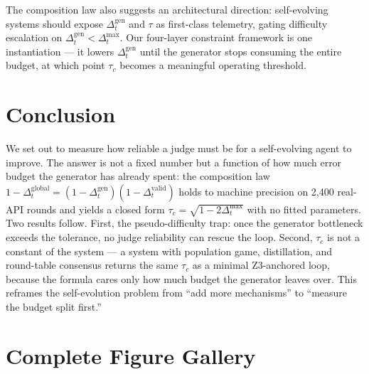 \documentclass{article}
\begin{document}
The composition law also suggests an architectural direction: self-evolving systems should expose
$\Delta_t^{\mathrm{gen}}$ and $\tau$ as first-class telemetry, gating difficulty escalation on
$\Delta_t^{\mathrm{gen}} < \Delta_t^{\max}$. Our four-layer constraint framework is one instantiation
--- it lowers $\Delta_t^{\mathrm{gen}}$ until the generator stops consuming the entire budget, at
which point $\tau_c$ becomes a meaningful operating threshold.

\section{Conclusion}

We set out to measure how reliable a judge must be for a self-evolving agent to improve. The answer is
not a fixed number but a function of how much error budget the generator has already spent: the
composition law
$1 - \Delta_t^{\mathrm{global}} = (1 - \Delta_t^{\mathrm{gen}})(1 - \Delta_t^{\mathrm{valid}})$ holds
to machine precision on 2{,}400 real-API rounds and yields a closed form
$\tau_c = \sqrt{1 - 2\Delta_t^{\max}}$ with no fitted parameters. Two results follow. First, the
pseudo-difficulty trap: once the generator bottleneck exceeds the tolerance, no judge reliability can
rescue the loop. Second, $\tau_c$ is not a constant of the system --- a system with population game,
distillation, and round-table consensus returns the same $\tau_c$ as a minimal Z3-anchored loop,
because the formula cares only how much budget the generator leaves over. This reframes the
self-evolution problem from ``add more mechanisms'' to ``measure the budget split first.''




\appendix

\section{Complete Figure Gallery}
\end{document}
